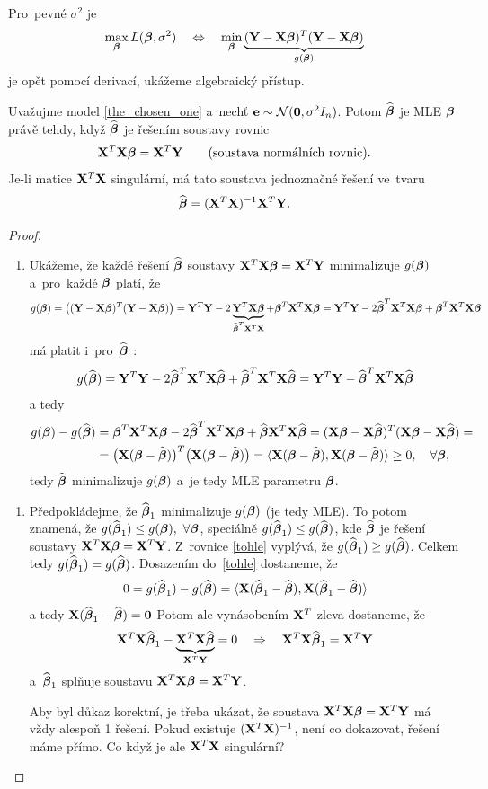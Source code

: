  Pro~pevné $\sigma^2$ je
 $$ \max_{\betab} L(\betab,\sigma^2)\quad\Leftrightarrow\quad\min_{\betab}\underbrace{(\Y-\X\betab)^T(\Y-\X\betab)}_{g(\betab)} $$
 je opět pomocí derivací, ukážeme algebraický přístup.

\newpage
 \begin{theorem}
 	Uvažujme model \eqref{the_chosen_one} a~nechť $\eb\sim\NN(\nula,\sigma^2 I_n)$. Potom $\wbetab$ je MLE $\betab$ právě tehdy, když $\wbetab$ je řešením soustavy rovnic
 	 $$ \X^T\X\betab = \X^T\Y\qquad\text{(soustava normálních rovnic)}. $$
 	Je-li matice $\X^T\X$ singulární, má tato soustava jednoznačné řešení ve~tvaru
 	 $$ \wbetab = (\X^T\X)^{-1}\X^T\Y. $$
 	\begin{proof}
 		\begin{enumerate}[$\Leftarrow$]
 			\item Ukážeme, že každé řešení $\wbetab$ soustavy $\X^T\X\betab = \X^T\Y$ minimalizuje $g(\betab)$ a~pro~každé $\betab$ platí, že
 			 $$ g(\bbeta) = \left((\Y-\X\betab)^T(\Y-\X\betab)\right) = \Y^T\Y-2\underbrace{\Y^T\X\betab}_{\wbetab^T\X^T\X}+\betab^T\X^T\X\betab = \Y^T\Y-2\wbetab^T\X^T\X\betab+\betab^T\X^T\X\betab $$
 			má platit i~pro~$\wbetab$ :
 			 $$ g(\wbetab) = \Y^T\Y-2\wbetab^T\X^T\X\wbetab+\wbetab^T\X^T\X\wbetab = \Y^T\Y-\wbetab^T\X^T\X\wbetab $$
 			a tedy
 			\begin{align}
 			g(\bbeta)-g(\wbetab)& = \betab^T\X^T\X\betab-2\wbetab^T\X^T\X\betab+\wbetab\X^T\X\wbetab = (\X\betab-\X\wbetab)^T(\X\betab-\X\wbetab) = \\
 			&= \big(\X(\betab-\wbetab) \big)^T\big(\X(\betab-\wbetab) \big) = \langle \X(\betab-\wbetab),\X(\betab-\wbetab) \rangle\geq 0,\quad\forall\betab, \label{tohle}
 			\end{align}
 			 tedy $\wbetab$ minimalizuje $g(\bbeta)$ a~je tedy MLE parametru $\betab$.
 		\end{enumerate}
 	\begin{enumerate}[$\Rightarrow$]
 		\item Předpokládejme, že $\wbetab_1$ minimalizuje $g(\betab)$ (je tedy MLE). To potom znamená, že \linebreak $g(\wbetab_1)\leq g(\betab),~\forall \betab$, speciálně $g(\wbetab_1)\leq g(\wbetab)$, kde $\wbetab$ je řešení soustavy $\X^T\X\betab = \X^T\Y$. Z~rovnice \eqref{tohle} vyplývá, že $g(\wbetab_1)\geq g(\wbetab)$. Celkem tedy $g(\wbetab_1) = g(\wbetab)$. Dosazením do~\eqref{tohle} dostaneme, že
 		 $$ 0 = g(\wbetab_1)-g(\wbetab) = \langle \X(\wbetab_1-\wbetab),\X(\wbetab_1-\wbetab) \rangle $$
 		a tedy $\X(\wbetab_1-\wbetab) = \nula$ Potom ale vynásobením $\X^T$ zleva dostaneme, že
 		 $$ \X^T\X\wbetab_1 - \underbrace{\X^T\X\wbetab}_{\X^T\Y} = 0\quad\Rightarrow\quad \X^T\X\wbetab_1 = \X^T\Y $$
 		 a~$\wbetab_1$ splňuje soustavu $\X^T\X\betab = \X^T\Y$.
 		
 		Aby byl důkaz korektní, je třeba ukázat, že soustava $\X^T\X\betab = \X^T\Y$ má vždy alespoň 1 řešení. Pokud existuje $(\X^T\X)^{-1}$, není co dokazovat, řešení máme přímo. Co když je ale $\X^T\X$ singulární?
 	\end{enumerate}
 	\end{proof}
 \end{theorem}
